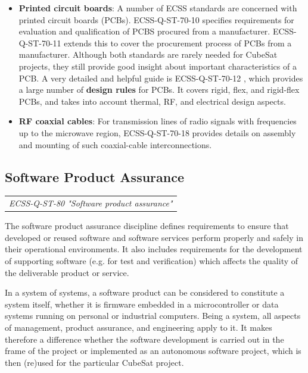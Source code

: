 \begin{itemize}
\item \textbf{Printed circuit boards}:  A number of ECSS standards are concerned with printed circuit boards (PCBs). ECSS-Q-ST-70-10 \cite{ECSS-Q-ST-70-10} specifies requirements for evaluation and qualification of PCBS procured from a manufacturer. ECSS-Q-ST-70-11 \cite{ECSS-Q-ST-70-11} extends this to cover the procurement process of PCBs from a manufacturer. Although both standards are rarely needed for CubeSat projects, they still provide good insight about important characteristics of a PCB. A very detailed and helpful guide is ECSS-Q-ST-70-12 \cite{ECSS-Q-ST-70-12}, which provides a large number of \textbf{design rules} for PCBs. It covers rigid, flex, and rigid-flex PCBs, and takes into account thermal, RF, and electrical design aspects.
\item \textbf{RF coaxial cables}: For transmission lines of radio signals with frequencies up to the microwave region, ECSS-Q-ST-70-18 \cite{ECSS-Q-ST-70-18} provides details on assembly and mounting of such coaxial-cable interconnections.
\end{itemize}

\subsection{Software Product Assurance}

\begin{tabular}{l}
\textit{ECSS-Q-ST-80 "Software product assurance" \cite{ECSS-Q-ST-80}}
\end{tabular}

The software product assurance discipline defines requirements to ensure that developed or reused software and software services perform properly and safely in their operational environments. It also includes requirements for the development of supporting software (e.g. for test and verification) which affects the quality of the deliverable product or service.

In a system of systems, a software product can be considered to constitute a system itself, whether it is firmware embedded in a microcontroller or data systems running on personal or industrial computers. Being a system, all aspects of management, product assurance, and engineering apply to it. It makes therefore a difference whether the software development is carried out in the frame of the project or implemented as an autonomous software project, which is then (re)used for the particular CubeSat project.

